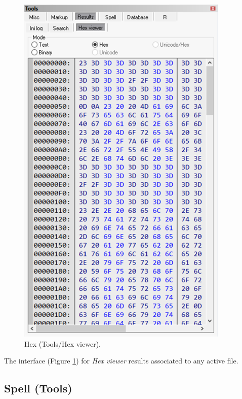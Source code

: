 \begin{figure}[H]
  \includegraphics[scale=0.6]{./res/tools_results_hex.png}
  \caption{Hex (Tools/Hex viewer).}
  \label{fig:tools_results_hex}
\end{figure}

The interface
(Figure \ref{fig:tools_results_hex})
for \textit{Hex viewer} results associated to any active file.


\hypertarget{working_tools_spell}{}
\subsection{Spell (Tools)}

